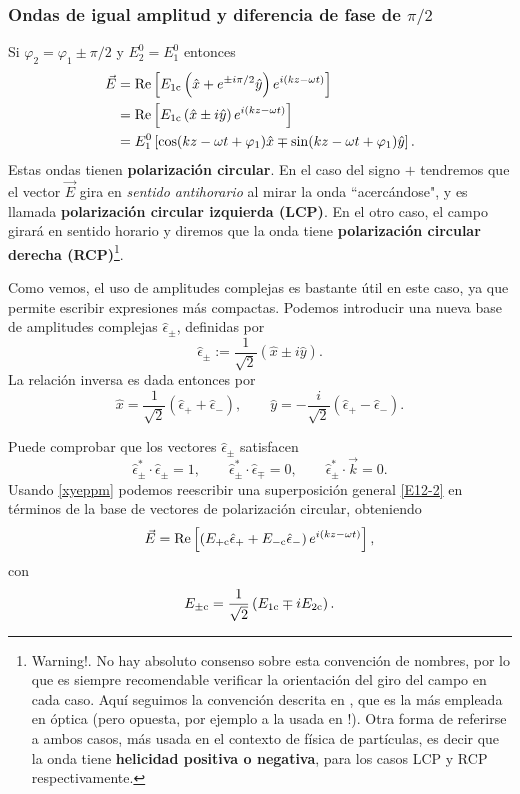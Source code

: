 \subsubsection{Ondas de igual amplitud y diferencia de fase de $\pi/2$}
 Si $\varphi_2=\varphi_1\pm\pi/2$ y $E_{2}^0=E_{1}^0$ entonces
\begin{align}
\vec{E} &= \operatorname{Re}\left[E_{1\rm c}\left(\hat{x}+ e^{\pm i\pi/2}\hat{y}\right) e^{i(kz-\omega t)}\right] \\
&= \operatorname{Re}\left[E_{1\rm c}\left(\hat{x}\pm i\hat{y}\right) e^{i(kz-\omega t)}\right]\\
&= E_{1}^0\left[\cos(kz-\omega t+\varphi_1)\hat{x} \mp \sin(kz-\omega t+\varphi_1)\hat{y}\right].
\end{align}
Estas ondas tienen \textbf{polarización circular}. En el caso del signo $+$ tendremos que el vector $\vec{E}$ gira en \textit{sentido antihorario} al mirar la onda ``acercándose", y es llamada \textbf{polarización circular izquierda (LCP)}. En el otro caso, el campo girará en sentido horario y diremos que la onda tiene \textbf{polarización circular derecha (RCP)}\footnote{Warning!. No hay absoluto consenso sobre esta convención de nombres, por lo que es siempre recomendable verificar la orientación del giro del campo en cada caso. Aquí seguimos la convención descrita en \cite{Jackson}, que es la más empleada en óptica (pero opuesta, por ejemplo a la usada en \cite{Griffiths2013}!). Otra forma de referirse a ambos casos, más usada en el contexto de física de partículas, es decir que la onda tiene \textbf{helicidad positiva o negativa}, para los casos LCP y RCP respectivamente.}.

Como vemos, el uso de amplitudes complejas es bastante útil en este caso, ya que permite escribir expresiones más compactas. Podemos introducir una nueva base de amplitudes complejas $\hat\epsilon_\pm$, definidas por
\begin{equation}
\hat\epsilon_\pm := \frac{1}{\sqrt{2}}(\hat{x}\pm i\hat{y}).
\end{equation}
La relación inversa es dada entonces por
\begin{equation}\label{xyeppm}
\hat{x}=\frac{1}{\sqrt{2}}(\hat\epsilon_+ + \hat\epsilon_-), \qquad \hat{y}=-\frac{i}{\sqrt{2}}(\hat\epsilon_+ - \hat\epsilon_-).
\end{equation}

Puede comprobar que los vectores $\hat\epsilon_\pm$ satisfacen
\begin{equation}
\hat\epsilon_\pm^*\cdot\hat\epsilon_\pm = 1, \qquad
\hat\epsilon_\pm^*\cdot\hat\epsilon_\mp = 0, \qquad 
\hat\epsilon_\pm^*\cdot\vec{k} = 0.
\end{equation}
Usando \eqref{xyeppm} podemos reescribir una superposición general \eqref{E12-2} en términos de la base de vectores de polarización circular, obteniendo
\begin{equation}
\vec{E} = \operatorname{Re}\left[\left(E_{+\rm c}\hat\epsilon_+ + E_{-\rm c}\hat\epsilon_-\right)e^{i(kz-\omega t)}\right],
\end{equation}
con
\begin{equation}
E_{\pm\rm c} = \frac{1}{\sqrt{2}}\left(E_{1\rm c}\mp iE_{2\rm c}\right).
\end{equation}


